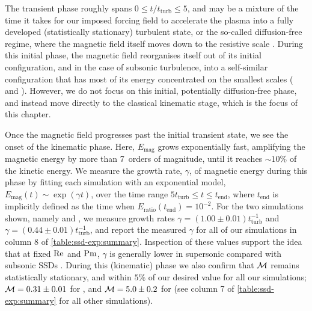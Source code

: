 The transient phase roughly spans $0 \leq t/t_\mathrm{turb} \leq 5$, and may be a mixture of the time it takes for our imposed forcing field to accelerate the plasma into a fully developed (statistically stationary) turbulent state, or the so-called diffusion-free regime, where the magnetic field itself moves down to the resistive scale \citep{schekochihin2002spectra}. During this initial phase, the magnetic field reorganises itself out of its initial configuration, and in the case of subsonic turbulence, into a self-similar configuration that has most of its energy concentrated on the smallest scales (\eg {} and \citealt{beattie2022growth}). However, we do not focus on this initial, potentially diffusion-free phase, and instead move directly to the classical kinematic stage, which is the focus of this chapter.

Once the magnetic field progresses past the initial transient state, we see the onset of the kinematic phase. Here, $E_\mathrm{mag}$ grows exponentially fast, amplifying the magnetic energy by more than 7~orders of magnitude, until it reaches $\sim 10\%$ of the kinetic energy. We measure the growth rate, $\gamma$, of magnetic energy during this phase by fitting each simulation with an exponential model, $E_\mathrm{mag}(t) \sim \exp(\gamma t)$, over the time range $5t_\mathrm{turb} \leq t \leq t_\mathrm{end}$, where $t_\mathrm{end}$ is implicitly defined as the time when $E_\mathrm{ratio}(t_\mathrm{end}) = 10^{-2}$. For the two simulations shown, namely  and , we measure growth rates $\gamma = (1.00 \pm 0.01)t_\mathrm{turb}^{-1}$ and $\gamma = (0.44 \pm 0.01)t_\mathrm{turb}^{-1}$, and report the measured $\gamma$ for all of our simulations in column 8 of \autoref{table:ssd-exp:summary}. Inspection of these values support the idea that at fixed $\mathrm{Re}$ and $\mathrm{Pm}$, $\gamma$ is generally lower in supersonic compared with subsonic SSDs \citep[see, \eg][for more detailed analysis on this effect]{federrath2011mach, schober2012magnetic, federrath2014turbulent, chirakkara2021efficient}. During this (kinematic) phase we also confirm that $\mathcal{M}$ remains statistically stationary, and within $5\%$ of our desired value for all our simulations; $\mathcal{M} = 0.31 \pm 0.01$ for , and $\mathcal{M} = 5.0 \pm 0.2$ for  (see column 7 of \autoref{table:ssd-exp:summary} for all other simulations).


